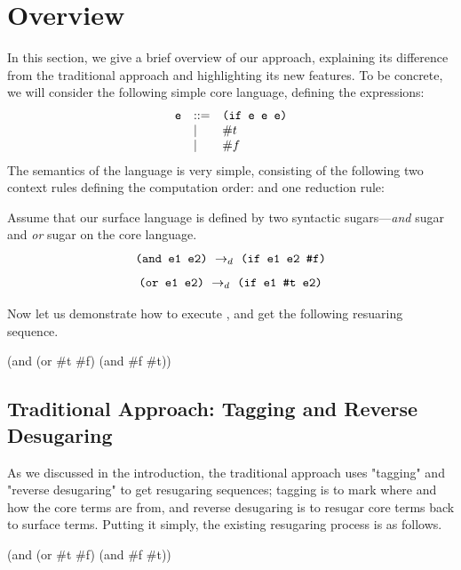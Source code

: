 \section{Overview}
\label{sec2}

In this section, we give a brief overview of our approach, explaining its difference from the traditional approach and highlighting its new features. To be concrete, we will consider the following simple core language, defining the  expressions:
\[
\begin{array}{lll}
\mbox{\tt e} &::=& \texttt{(if~e~e~e)}\\
& |& \#t\\
& |& \#f
\end{array}
\]
The semantics of the language is very simple, consisting of the following two context rules defining the computation order:
{\rightarrow{}}
and one reduction rule:

Assume that our surface language is defined by two syntactic sugars---\emph{and} sugar and \emph{or} sugar on the core language.
\[
\texttt{(and e1 e2)} ~\rightarrow_d~ \texttt{(if e1 e2 \#f)}
\]
\[
\texttt{(or e1 e2)} ~\rightarrow_d~ \texttt{(if e1 \#t e2)}
\]

Now let us demonstrate how to execute , and get the following resuaring sequence.
\begin{Codes}
    (and (or \#t \#f) (and \#f \#t))
\end{Codes}



\subsection{Traditional Approach: Tagging and Reverse Desugaring}

As we discussed in the introduction, the traditional approach uses "tagging" and "reverse desugaring" to get resugaring sequences; tagging is to mark where and how the core terms are from, and reverse desugaring is to resugar core terms back to surface terms. Putting it simply, the existing resugaring process is as follows.

\begin{Codes}
    (and (or \#t \#f) (and \#f \#t))
 
\end{Codes}

